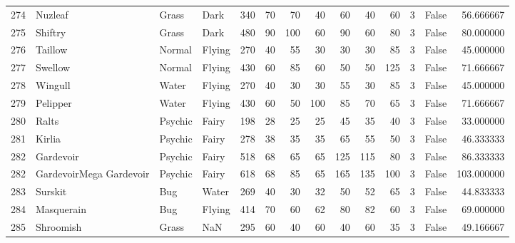 \begin{tabular}{rlllrrrrrrrrlr}
 274 &                    Nuzleaf &     Grass &      Dark &    340 &   70 &      70 &       40 &       60 &       40 &     60 &           3 &      False &   56.666667 \\
 275 &                    Shiftry &     Grass &      Dark &    480 &   90 &     100 &       60 &       90 &       60 &     80 &           3 &      False &   80.000000 \\
 276 &                    Taillow &    Normal &    Flying &    270 &   40 &      55 &       30 &       30 &       30 &     85 &           3 &      False &   45.000000 \\
 277 &                    Swellow &    Normal &    Flying &    430 &   60 &      85 &       60 &       50 &       50 &    125 &           3 &      False &   71.666667 \\
 278 &                    Wingull &     Water &    Flying &    270 &   40 &      30 &       30 &       55 &       30 &     85 &           3 &      False &   45.000000 \\
 279 &                   Pelipper &     Water &    Flying &    430 &   60 &      50 &      100 &       85 &       70 &     65 &           3 &      False &   71.666667 \\
 280 &                      Ralts &   Psychic &     Fairy &    198 &   28 &      25 &       25 &       45 &       35 &     40 &           3 &      False &   33.000000 \\
 281 &                     Kirlia &   Psychic &     Fairy &    278 &   38 &      35 &       35 &       65 &       55 &     50 &           3 &      False &   46.333333 \\
 282 &                  Gardevoir &   Psychic &     Fairy &    518 &   68 &      65 &       65 &      125 &      115 &     80 &           3 &      False &   86.333333 \\
 282 &    GardevoirMega Gardevoir &   Psychic &     Fairy &    618 &   68 &      85 &       65 &      165 &      135 &    100 &           3 &      False &  103.000000 \\
 283 &                    Surskit &       Bug &     Water &    269 &   40 &      30 &       32 &       50 &       52 &     65 &           3 &      False &   44.833333 \\
 284 &                 Masquerain &       Bug &    Flying &    414 &   70 &      60 &       62 &       80 &       82 &     60 &           3 &      False &   69.000000 \\
 285 &                  Shroomish &     Grass &       NaN &    295 &   60 &      40 &       60 &       40 &       60 &     35 &           3 &      False &   49.166667 \\

\end{tabular}
